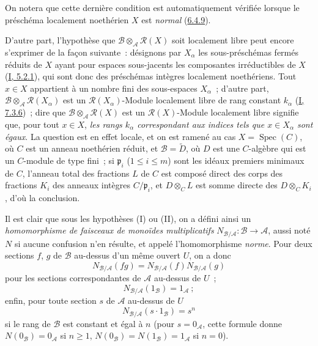
On notera que cette dernière condition est automatiquement vérifiée lorsque
le préschéma localement noethérien $X$ est \emph{normal}
(\hyperref[II.6.4.9-fr]{6.4.9}).

D'autre part, l'hypothèse que
$\mathcal{B}\otimes_{\mathcal{A}}\mathcal{R}(X)$ soit localement libre peut
encore s'exprimer de la façon suivante~: désignons par $X_\alpha$ les
sous-préschémas fermés réduits de $X$ ayant pour espaces sous-jacents les
composantes irréductibles de $X$ (\hyperref[I.5.2.1-fr]{I, 5.2.1}), qui sont
donc des préschémas intègres localement noethériens. Tout $x\in X$ appartient
à un nombre fini des sous-espaces $X_\alpha$~; d'autre part,
$\mathcal{B}\otimes_{\mathcal{A}}\mathcal{R}(X_\alpha)$ est un
$\mathcal{R}(X_\alpha)$-Module localement libre de rang constant $k_\alpha$
(\hyperref[I.7.3.6-fr]{I, 7.3.6})~; dire que
$\mathcal{B}\otimes_{\mathcal{A}}\mathcal{R}(X)$ est un
$\mathcal{R}(X)$-Module localement libre signifie que, pour tout $x\in X$,
\emph{les rangs $k_\alpha$ correspondant aux indices tels que $x\in X_\alpha$
sont égaux}. La question est en effet locale, et on est ramené au cas
$X=\operatorname{Spec}(C)$, où $C$ est un anneau noethérien réduit, et
$\mathcal{B}=\widetilde{D}$, où $D$ est une $C$-algèbre qui est un $C$-module
de type fini~; si $\mathfrak{p}_i$ ($1\leq i\leq m$) sont les idéaux premiers
minimaux de $C$, l'anneau total des fractions $L$ de $C$ est composé direct
des corps des fractions $K_i$ des anneaux intègres $C/\mathfrak{p}_i$, et
$D\otimes_C L$ est somme directe des $D\otimes_C K_i$, d'où la conclusion.

Il est clair que sous les hypothèses (I) ou (II), on a défini ainsi un
\emph{homomorphisme de faisceaux de monoïdes multiplicatifs}
$N_{\mathcal{B}/\mathcal{A}}:\mathcal{B}\to\mathcal{A}$, aussi noté $N$ si
aucune confusion n'en résulte, et appelé l'homomorphisme \emph{norme}. Pour
deux sections $f$, $g$ de $\mathcal{B}$ au-dessus d'un même ouvert $U$, on a
donc
\[
\label{II.6.5.1.1-fr}
N_{\mathcal{B}/\mathcal{A}}(fg)
=N_{\mathcal{B}/\mathcal{A}}(f)N_{\mathcal{B}/\mathcal{A}}(g)
\tag{6.5.1.1}
\]
pour les sections correspondantes de $\mathcal{A}$ au-dessus de $U$~;
\[
\label{II.6.5.1.2-fr}
N_{\mathcal{B}/\mathcal{A}}(1_{\mathcal{B}})=1_{\mathcal{A}}~;
\tag{6.5.1.2}
\]
enfin, pour toute section $s$ de $\mathcal{A}$ au-dessus de $U$
\[
\label{II.6.5.1.3-fr}
N_{\mathcal{B}/\mathcal{A}}(s\cdot1_{\mathcal{B}})=s^n
\tag{6.5.1.3}
\]
si le rang de $\mathcal{B}$ est constant et égal à $n$ (pour
$s=0_{\mathcal{A}}$, cette formule donne
$N(0_{\mathcal{B}})=0_{\mathcal{A}}$ si $n\geq1$,
$N(0_{\mathcal{B}})=N(1_{\mathcal{B}})=1_{\mathcal{A}}$ si $n=0$).

